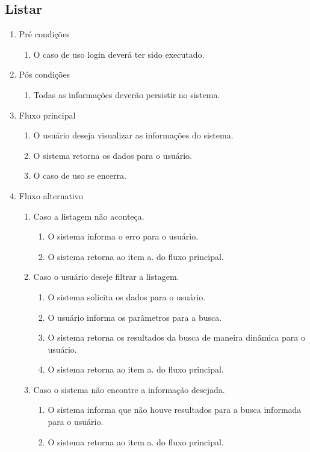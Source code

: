 \subsection{Listar}
\begin{enumerate}
	\item Pré condições
	\begin{enumerate}
		\item O caso de uso login deverá ter sido executado.
	\end{enumerate}
	\item Pós condições
	\begin{enumerate}
		\item Todas as informações deverão persistir no sistema.
	\end{enumerate}
	\item Fluxo principal
	\begin{enumerate}
		\item O usuário deseja visualizar as informações do sistema.
		\item O sistema retorna os dados para o usuário.
		\item O caso de uso se encerra.
	\end{enumerate}
	\item Fluxo alternativo
	\begin{enumerate}
		\item Caso a listagem não aconteça.
		\begin{enumerate}
			\item O sistema informa o erro para o usuário.
			\item O sistema retorna ao item a. do fluxo principal.
		\end{enumerate}
		\item Caso o usuário deseje filtrar a listagem.
		\begin{enumerate}
			\item O sistema solicita os dados para o usuário.
			\item O usuário informa os parâmetros para a busca.
			\item O sistema retorna os resultados da busca de maneira dinâmica para o usuário.
			\item O sistema retorna ao item a. do fluxo principal.
		\end{enumerate}
		\item Caso o sistema não encontre a informação desejada.
		\begin{enumerate}
			\item O sistema informa que não houve resultados para a busca informada para o usuário.
			\item O sistema retorna ao item a. do fluxo principal.
		\end{enumerate}
	\end{enumerate}
\end{enumerate}
